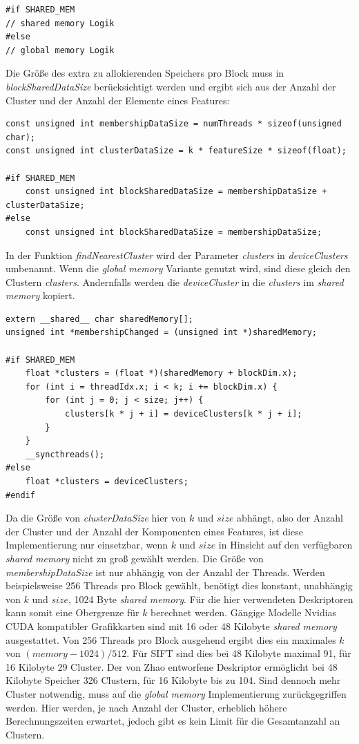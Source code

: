 \lstset{language=C}
\begin{lstlisting}
#if SHARED_MEM
// shared memory Logik
#else
// global memory Logik
\end{lstlisting}

Die Größe des extra zu allokierenden Speichers pro Block muss in \textit{blockSharedDataSize} berücksichtigt werden und ergibt sich aus der Anzahl der Cluster und der Anzahl der Elemente eines Features:

\lstset{language=C}
\begin{lstlisting}
const unsigned int membershipDataSize = numThreads * sizeof(unsigned char);
const unsigned int clusterDataSize = k * featureSize * sizeof(float);

#if SHARED_MEM
    const unsigned int blockSharedDataSize = membershipDataSize + clusterDataSize;
#else
	const unsigned int blockSharedDataSize = membershipDataSize;
\end{lstlisting}

In der Funktion \textit{findNearestCluster} wird der Parameter \textit{clusters} in \textit{deviceClusters} umbenannt. Wenn die \textit{global memory} Variante genutzt wird, sind diese gleich den Clustern \textit{clusters}. Andernfalls werden die \textit{deviceCluster} in die \textit{clusters} im \textit{shared memory} kopiert.

\lstset{language=C}
\begin{lstlisting}
extern __shared__ char sharedMemory[];
unsigned int *membershipChanged = (unsigned int *)sharedMemory;
    
#if SHARED_MEM
    float *clusters = (float *)(sharedMemory + blockDim.x);
	for (int i = threadIdx.x; i < k; i += blockDim.x) {
  		for (int j = 0; j < size; j++) {
    		clusters[k * j + i] = deviceClusters[k * j + i];
  		}
	}
	__syncthreads();
#else
    float *clusters = deviceClusters;
#endif
\end{lstlisting}

Da die Größe von \textit{clusterDataSize} hier von $k$ und $size$ abhängt, also der Anzahl der Cluster und der Anzahl der Komponenten eines Features, ist diese Implementierung nur einsetzbar, wenn $k$ und $size$ in Hinsicht auf den verfügbaren \textit{shared memory} nicht zu groß gewählt werden. Die Größe von \textit{membershipDataSize} ist nur abhängig von der Anzahl der Threads. Werden beispielsweise 256 Threads pro Block gewählt, benötigt dies konstant, unabhängig von $k$ und $size$, 1024 Byte \textit{shared memory}. Für die hier verwendeten Deskriptoren kann somit eine Obergrenze für $k$ berechnet werden. Gängige Modelle Nvidias CUDA kompatibler Grafikkarten sind mit 16 oder 48 Kilobyte \textit{shared memory} ausgestattet. Von 256 Threads pro Block ausgehend ergibt dies ein maximales $k$ von $(memory - 1024) / 512$. Für SIFT sind dies bei 48 Kilobyte maximal 91, für 16 Kilobyte 29 Cluster. Der von Zhao entworfene Deskriptor ermöglicht bei 48 Kilobyte Speicher 326 Clustern, für 16 Kilobyte bis zu 104. Sind dennoch mehr Cluster notwendig, muss auf die \textit{global memory} Implementierung zurückgegriffen werden. Hier werden, je nach Anzahl der Cluster, erheblich höhere Berechnungszeiten erwartet, jedoch gibt es kein Limit für die Gesamtanzahl an Clustern.